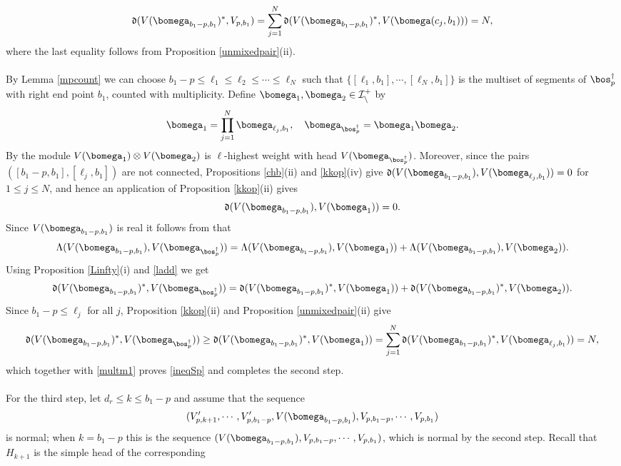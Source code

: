 \documentclass[11pt,reqno]{amsart}
\theoremstyle{definition} \newtheorem*{defn}{Definition}
\theoremstyle{definition}
\newenvironment{pf}{\proof}{\endproof}
\numberwithin{equation}{section}
\newcommand{\lie}[1]{\mathfrak{#1}}
\begin{document}
\begin{pf}
\begin{equation}\label{multm1}\lie d (V(\bomega_{b_1-p,b_1})^*, V_{p,b_1}) = \sum_{j=1}^{N} \lie d (V(\bomega_{b_1-p,b_1})^*,V(\bomega(c_j,b_1)))=N,
\end{equation}
where the last equality follows from Proposition \ref{unmixedpair}(ii).
\\\\
By Lemma \ref{mpcount} we can choose $b_1-p\le \ell_1\leq \ell_2\leq \cdots \leq \ell_{N}$ such that
$\{[\ell_1,b_1],\cdots, [\ell_{N},b_1]\}$ is the multiset of segments of $\bos_p^\dagger$ with right end
point $b_1$, counted with multiplicity. Define $\bomega_1,\bomega_2\in\cal I_n^+$ by
$$\bomega_1 = \prod_{j=1}^{N}\bomega_{\ell_j,b_1}, \ \ \ \bomega_{\bos_p^\dagger} = \bomega_1\bomega_2.$$
By \cite[Corollary 3.2]{BC25b} the module $V(\bomega_1)\otimes V(\bomega_2)$ is $\ell$-highest weight
with head $V(\bomega_{\bos_p^\dagger})$. Moreover, since the pairs $([b_1-p,b_1],[\ell_j,b_1])$ are not
connected, Propositions \ref{chb}(ii) and \ref{kkop}(iv) give
$\lie d (V(\bomega_{b_1-p,b_1}), V(\bomega_{\ell_j,b_1}))=0$ for $1\leq j\leq N$, and hence an
application of Proposition \ref{kkop}(ii) gives
$$ \lie d(V(\bomega_{b_1-p,b_1}),V(\bomega_1))=0.$$
Since $V(\bomega_{b_1-p,b_1})$ is real it follows from \cite[Lemma 4.3(ii)]{KKOP} that
$$\Lambda(V(\bomega_{b_1-p,b_1}), V(\bomega_{\bos_p^\dagger})) = \Lambda(V(\bomega_{b_1-p,b_1}), V(\bomega_1))+\Lambda(V(\bomega_{b_1-p,b_1}), V(\bomega_2)).$$
Using Proposition \ref{Linfty}(i) and \eqref{ladd} we get
$$\lie d (V(\bomega_{b_1-p,b_1})^*, V(\bomega_{\bos_p^\dagger})) = \lie d (V(\bomega_{b_1-p,b_1})^*, V(\bomega_1))+ \lie d (V(\bomega_{b_1-p,b_1})^*, V(\bomega_2)).$$
Since $b_1-p\le\ell_j$ for all $j$, Proposition \ref{kkop}(ii) and Proposition \ref{unmixedpair}(ii) give
\begin{equation*}\lie d (V(\bomega_{b_1-p,b_1})^*, V(\bomega_{\bos_p^\dagger})) \geq \lie d (V(\bomega_{b_1-p,b_1})^*, V(\bomega_1)) = \sum_{j=1}^{N}\lie d (V(\bomega_{b_1-p,b_1})^*, V(\bomega_{\ell_j,b_1})) = N,
\end{equation*}
which together with \eqref{multm1} proves \eqref{ineqSp} and completes the second step.
\\\\
For the third step, let $d_r\leq k\leq b_1-p$ and assume that the sequence
$$(V_{p,k+1}',\cdots, V_{p,b_1-p}', V(\bomega_{b_1-p,b_1}), V_{p,b_1-p},\cdots, V_{p,b_1})$$
is normal; when $k=b_1-p$ this is the sequence $(V(\bomega_{b_1-p,b_1}), V_{p,b_1-p},\cdots, V_{p,b_1})$,
which is normal by the second step. Recall that $H_{k+1}$ is the simple head of the corresponding

\end{pf}
\end{document}
